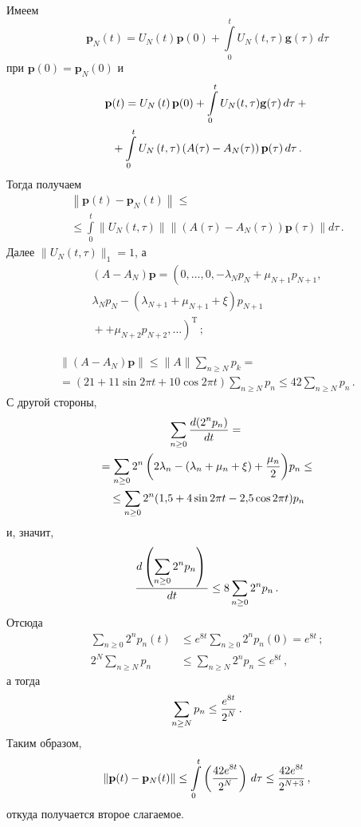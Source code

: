 \begin{multicols}{2}
Имеем
\begin{equation*}
{\mathbf p}_N (t)= U_N(t){\mathbf p} (0) + \int\limits_0^t U_N(t,\tau){\mathbf
g}(\tau)\, d\tau
\end{equation*}
при ${\mathbf p} (0) = {\mathbf p}_N (0)$ и
\begin{multline*}
{\mathbf p} (t)= U_N \left(t\right) {\mathbf p} (0) + \int\limits_0^t
U_N(t,\tau){\bf g}(\tau)\, d\tau + {}\\
{}+\int\limits_0^t U_N \left(t,
\tau\right) \left(A(\tau) - A_N(\tau) \right) {\bf p} (\tau)\,
d\tau\,.
\end{multline*}
Тогда получаем
\begin{multline*}
\left\|{\mathbf p} (t) - {\mathbf p}_N (t)\right\| \le {}\\
{}\le \int\limits_0^t
\|U_N (t, \tau)\| \|(A(\tau) - A_N(\tau)) {\mathbf p} (\tau)\| d\tau \,.
\end{multline*}
Далее  $\|U_N (t, \tau)\|_1=1$, а
\begin{multline*}
\left(A -A_N\right) {\mathbf p} = \left(0,\dots,0,-\lambda_Np_N +
\mu_{N+1}p_{N+1},\right.\\
 \lambda_Np_N - \left(\lambda_{N+1} + \mu_{N+1}+\xi
\right)p_{N+1}{}\\
\left.{}+ + \mu_{N+2}p_{N+2},\dots \right)^{\mathrm{T}}\,;
\end{multline*}

\noindent
\begin{multline*}
\|(A -A_N) {\mathbf p}\| \le \|A\| \sum_{n \ge N} p_k={}\\
{}=(21+11\sin{2\pi t}+10\cos{2\pi t})\sum_{n \ge N} p_n \le 
42 \sum_{n \ge N} p_n\,.
\end{multline*}
С другой стороны,
\begin{multline*}
\sum_{n\ge {0}} \displaystyle\frac{\displaystyle d(2^n p_n)\mathstrut}{\displaystyle dt\mathstrut} = {}\\
{}= \sum_{n \ge {0}} {2^n\left(2\lambda_n - (\lambda_n + \mu_n + \xi) + 
\displaystyle\frac{\displaystyle \mu_n\mathstrut}{\displaystyle 2\mathstrut}\right)}p_n \le{}\\
{}\le \sum_{n \ge {0}} {2^n(1{,}5 + 4 \sin{2\pi t}-2{,}5 \cos{2\pi t}})p_n
\end{multline*}
и, значит,
\begin{equation*}
\displaystyle\frac{\displaystyle d\left(\sum_{n\ge {0}}{2^n p_n}\right)\mathstrut}{\displaystyle dt\mathstrut}\le 8\sum_{n\ge {0}}{2^n p_n}\,.
\end{equation*}
Отсюда
\begin{align*}
\sum_{n\ge {0}}{2^{n} p_n(t)}&\le e^{8 t}\sum_{n\ge {0}}{2^n p_n (0)}
= e^{8 t}\,;\\
2^{N}\sum_{n\ge {N}}{p_n}&\le \sum_{n\ge {N}}{2^n p_n}\le e^{8 t}\,,
\end{align*}
а тогда
\begin{equation*}
\sum_{n \ge {N}}p_{n} \le \displaystyle\frac{\displaystyle e^{8 t}\mathstrut}{\displaystyle 2^{N}\mathstrut}\,.
\end{equation*}
Таким образом,
\begin{equation*}
\left\|{\bf p} (t) - {\mathbf p}_N (t)\right\| \le \int\limits_0^t
\left(\displaystyle\frac{\displaystyle 42 e^{8 t}\mathstrut}{\displaystyle 2^N\mathstrut}\right)\, d\tau \le \displaystyle\frac{\displaystyle 42 e^{8 t}\mathstrut}{\displaystyle 2^{N+3}\mathstrut}\,,
\end{equation*}
откуда получается второе слагаемое.


\end{multicols}
